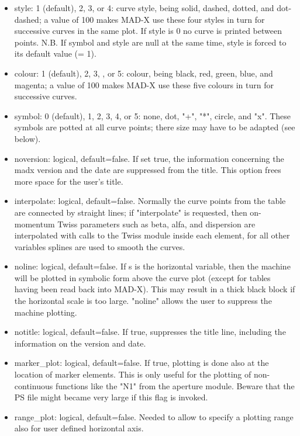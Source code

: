 \begin{itemize}
\begin{itemize}
	\item style: 1 (default), 2, 3, or 4: curve style, being solid, dashed, dotted, and dot-dashed; a value of 100 makes MAD-X use these four styles in turn for successive curves in the same plot. If style is 0 no curve is printed between points.  N.B. If symbol and style are null at the same time, style is forced to its default value (= 1).  
	\item colour: 1 (default), 2, 3, , or 5: colour, being black, red, green, blue, and magenta; a value of 100 makes MAD-X use these five colours in turn for successive curves. 
	\item symbol: 0 (default), 1, 2, 3, 4, or 5: none, dot, "+", "*", circle, and "x". These symbols are potted at all curve points; there size may have to be adapted (see below).  
	\item noversion: logical, default=false. If set true, the information concerning the madx version and the date are suppressed from the title. This option frees more space for the user's title.  
	\item interpolate: logical, default=false. Normally the curve points from the table are connected by straight lines; if "interpolate" is requested, then on-momentum Twiss parameters such as beta, alfa, and dispersion are interpolated with calls to the Twiss module inside each element, for all other variables splines are used to smooth the curves.  
	\item noline: logical, default=false. If s is the horizontal variable, then the machine will be plotted in symbolic form above the curve plot (except for tables having been read back into MAD-X). This may result in a thick black block if the horizontal scale is too large. "noline" allows the user to suppress the machine plotting.   
	\item notitle: logical, default=false. If true, suppresses the title line, including the information on the version and date. 
	\item marker\_plot: logical, default=false. If true, plotting is done also at the location of marker elements. This is only useful for the plotting of non-continuous functions like the "N1" from the aperture module. Beware that the PS file might became very large if this flag is invoked. 
	\item range\_plot: logical, default=false. Needed to allow to specify a plotting range also for user defined horizontal axis.  

\end{itemize}
\end{itemize}
